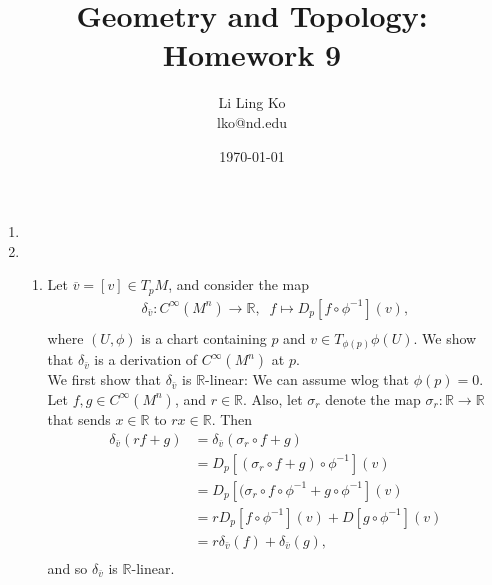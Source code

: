\documentclass{article}
\begin{document}
\title{Geometry and Topology: Homework 9}
\author{Li Ling Ko\\ lko@nd.edu}
\date{\today}
\maketitle

\begin{enumerate}[label={\bf Q\arabic*:}]
  \item
  \item
    \begin{enumerate}
      \item Let $\overline{v}=[v]\in T_pM$, and consider the map
        \begin{align*}
          \delta_{\bar{v}}:C^\infty(M^n)\rightarrow\mathbb{R},\;\; f\mapsto
          D_p[f\circ\phi^{-1}](v), \\
        \end{align*}
        where $(U,\phi)$ is a chart containing $p$ and $v\in
        T_{\phi(p)}\phi(U)$. We show that $\delta_{\bar{v}}$ is a
        derivation of $C^\infty(M^n)$ at $p$. \\

        We first show that $\delta_{\bar{v}}$ is $\mathbb{R}$-linear: We
        can assume wlog that $\phi(p)=0$. Let $f,g\in C^\infty(M^n)$, and
        $r\in\mathbb{R}$. Also, let $\sigma_r$ denote the map
        $\sigma_r:\mathbb{R}\rightarrow\mathbb{R}$ that sends
        $x\in\mathbb{R}$ to $rx\in\mathbb{R}$. Then
        \begin{align*}
          \delta_{\bar{v}}(rf+g)  &=\delta_{\bar{v}}(\sigma_r\circ f+g) \\
            &=D_p[(\sigma_r\circ f+g)\circ\phi^{-1}](v) \\
            &=D_p[(\sigma_r\circ f\circ\phi^{-1} +g\circ\phi^{-1}](v) \\
            &=rD_p[f\circ\phi^{-1}](v) +D[g\circ\phi^{-1}](v) \\
            &=r\delta_{\bar{v}}(f) +\delta_{\bar{v}}(g), \\
        \end{align*}
        and so $\delta_{\bar{v}}$ is $\mathbb{R}$-linear.
    \end{enumerate}
\end{enumerate}
\end{document}

